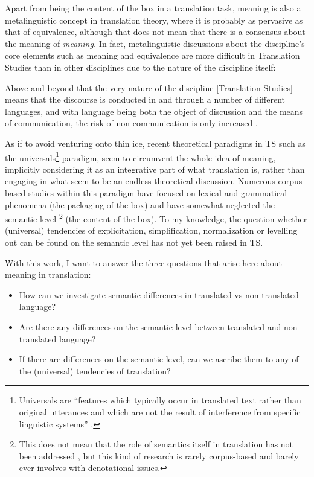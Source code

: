 Apart from being the content of the box in a translation task, meaning is also a metalinguistic concept in translation theory, where it is probably as pervasive as that of equivalence, although that does not mean that there is a consensus about the meaning of \textit{meaning.} In fact, metalinguistic discussions about the discipline’s core elements such as meaning and equivalence are more difficult in Translation Studies than in other disciplines due to the nature of the discipline itself: 

Above and beyond that the very nature of the discipline [Translation Studies] means that the discourse is conducted in and through a number of different languages, and with language being both the object of discussion and the means of communication, the risk of non-communication is only increased \citep[314]{snell-hornby_whats_2007}.

As if to avoid venturing onto thin ice, recent theoretical paradigms in TS such as the universals\footnote{Universals are “features which typically occur in translated text rather than original utterances and which are not the result of interference from specific linguistic systems” \citep[243]{baker_corpus_1993}.} paradigm, seem to circumvent the whole idea of meaning, implicitly considering it as an integrative part of what translation is, rather than engaging in what seem to be an endless theoretical discussion. Numerous corpus-based studies within this paradigm \citep{poyatos_punctuation_1997,laviosa_core_1998, laviosa_corpus-based_2002,olohan_strange_2000,olohan_reporting_2000,baker_corpus-based_2004,bernardini_practice_2011,delaere_is_2012,oakes_lexical_2012,kruger_corpus-based_2012} have focused on lexical and grammatical phenomena (the packaging of the box) and have somewhat neglected the semantic level \citep[28]{laviosa_corpus-based_2002}\footnote{This does not mean that the role of semantics itself in translation has not been addressed \citep{lewandowska-tomasczyk_specification_2010}, but this kind of research is rarely corpus-based and barely ever involves with denotational issues.} (the content of the box). To my knowledge, the question whether (universal) tendencies of explicitation, simplification, normalization or levelling out can be found on the semantic level has not yet been raised in TS.

With this work, I want to answer the three questions that arise here about meaning in translation:

\begin{itemize}
\item 
How can we investigate semantic differences in translated vs non-translated language?
\item 
Are there any differences on the semantic level between translated and non-translated language? 
\item 
If there are differences on the semantic level, can we ascribe them to any of the (universal) tendencies of translation?
\end{itemize}


